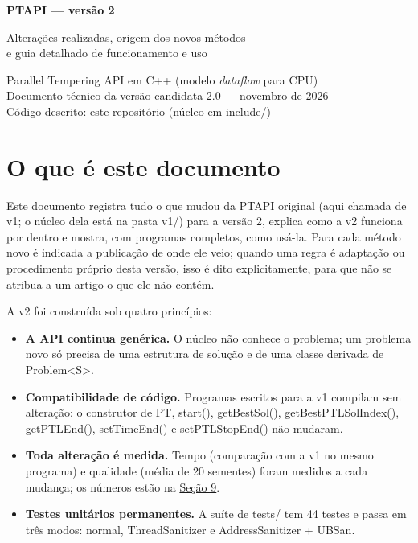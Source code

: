 \documentclass[10pt,a4paper]{article}
\newcommand{\code}[1]{{\ttfamily #1}}
\begin{document}
\begin{titlepage}
\sffamily
\vspace*{70mm}
{\fontsize{32}{36}\selectfont\bfseries\color{azul} PTAPI — versão 2\par}
\vspace{6mm}
{\Large Alterações realizadas, origem dos novos métodos\\[2pt] e guia detalhado de funcionamento e uso\par}
\vspace{18mm}
{\color{cinza}
Parallel Tempering API em C++ (modelo \textit{dataflow} para CPU)\\[3pt]
Documento técnico da versão candidata 2.0 — novembro de 2026\\[3pt]
Código descrito: este repositório (núcleo em \code{include/})\par}
\end{titlepage}

\tableofcontents
\clearpage

\section{O que é este documento}\label{s1}

Este documento registra tudo o que mudou da PTAPI original (aqui chamada de v1; o núcleo dela está na pasta \code{v1/\allowbreak{}}) para a versão 2, explica como a v2 funciona por dentro e mostra, com programas completos, como usá-la. Para cada método novo é indicada a publicação de onde ele veio; quando uma regra é adaptação ou procedimento próprio desta versão, isso é dito explicitamente, para que não se atribua a um artigo o que ele não contém.

A v2 foi construída sob quatro princípios:

\begin{itemize}
\item \textbf{A API continua genérica.} O núcleo não conhece o problema; um problema novo só precisa de uma estrutura de solução e de uma classe derivada de \code{Problem<S>}.
\item \textbf{Compatibilidade de código.} Programas escritos para a v1 compilam sem alteração: o construtor de \code{PT}, \code{start()}, \code{getBestSol()}, \code{getBestPTLSolIndex()}, \code{getPTLEnd()}, \code{setTimeEnd()} e \code{setPTLStopEnd()} não mudaram.
\item \textbf{Toda alteração é medida.} Tempo (comparação com a v1 no mesmo programa) e qualidade (média de 20 sementes) foram medidos a cada mudança; os números estão na \hyperref[s9]{Seção 9}.
\item \textbf{Testes unitários permanentes.} A suíte de \code{tests/\allowbreak{}} tem 44 testes e passa em três modos: normal, ThreadSanitizer e AddressSanitizer + UBSan. \end{itemize}
\end{document}
